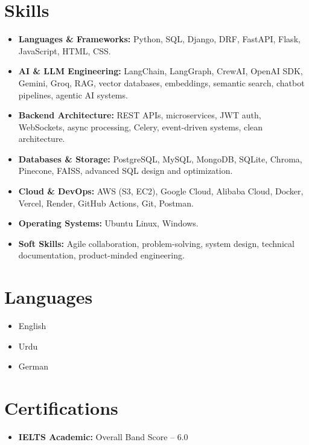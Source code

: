 \documentclass[letterpaper,11pt]{article}
\newcommand{\resumeItem}[1]{\item\small{{#1 \vspace{-2pt}}}}
\newcommand{\resumeItemListStart}{\begin{itemize}}
\newcommand{\resumeItemListEnd}{\end{itemize}\vspace{-5pt}}
\begin{document}
\section{Skills}
\resumeItemListStart
\resumeItem{\textbf{Languages \& Frameworks:} Python, SQL, Django, DRF, FastAPI, Flask, JavaScript, HTML, CSS.}
\resumeItem{\textbf{AI \& LLM Engineering:} LangChain, LangGraph, CrewAI, OpenAI SDK, Gemini, Groq, RAG, vector databases, embeddings, semantic search, chatbot pipelines, agentic AI systems.}
\resumeItem{\textbf{Backend Architecture:} REST APIs, microservices, JWT auth, WebSockets, async processing, Celery, event-driven systems, clean architecture.}
\resumeItem{\textbf{Databases \& Storage:} PostgreSQL, MySQL, MongoDB, SQLite, Chroma, Pinecone, FAISS, advanced SQL design and optimization.}
\resumeItem{\textbf{Cloud \& DevOps:} AWS (S3, EC2), Google Cloud, Alibaba Cloud, Docker, Vercel, Render, GitHub Actions, Git, Postman.}
\resumeItem{\textbf{Operating Systems:} Ubuntu Linux, Windows.}
\resumeItem{\textbf{Soft Skills:} Agile collaboration, problem-solving, system design, technical documentation, product-minded engineering.}
\resumeItemListEnd

\section{Languages}
\resumeItemListStart
\resumeItem{English}
\resumeItem{Urdu}
\resumeItem{German}
\resumeItemListEnd

\section{Certifications}
\resumeItemListStart
\resumeItem{\textbf{IELTS Academic:} Overall Band Score -- 6.0}
\resumeItemListEnd
\end{document}
